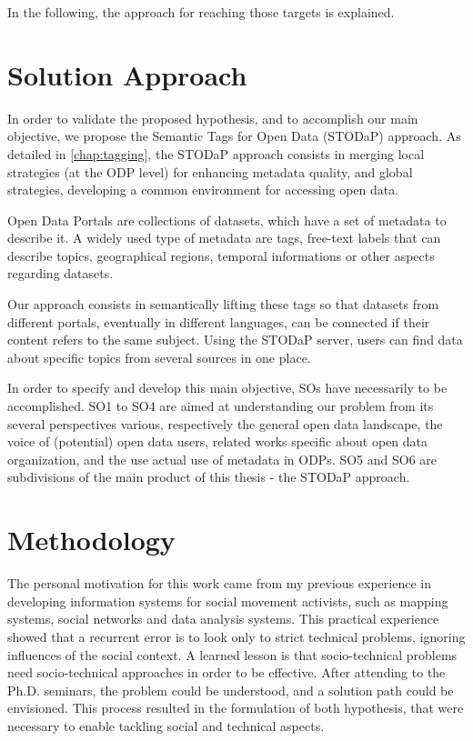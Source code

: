 {In the following, the approach for reaching those targets is explained.

\section{Solution Approach}

In order to validate the proposed hypothesis, and to accomplish our main objective, we propose the Semantic Tags for Open Data (STODaP) approach.
As detailed in \autoref{chap:tagging}, the STODaP approach consists in merging local strategies (at the ODP level) for enhancing metadata quality, and global strategies, developing a common environment for accessing open data.

Open Data Portals are collections of datasets, which have a set of metadata to describe it.
A widely used type of metadata are tags, free-text labels that can describe topics, geographical regions, temporal informations or other aspects regarding datasets.

Our approach consists in semantically lifting these tags so that datasets from different portals, eventually in different languages, can be connected if their content refers to the same subject. 
Using the STODaP server, users can find data about specific topics from several sources in one place.

In order to specify and develop this main objective, SOs have necessarily to be accomplished.
SO1 to SO4 are aimed at understanding our problem from its several perspectives various, respectively the general open data landscape, the voice of (potential) open data users, related works specific about open data organization, and the use actual use of metadata in ODPs.
SO5 and SO6 are subdivisions of the main product of this thesis - the STODaP approach.



\section{Methodology}

The personal motivation for this work came from my previous experience in developing information systems for social movement activists, such as mapping systems, social networks and data analysis systems.
This practical experience showed that a recurrent error is to look only to strict technical problems, ignoring influences of the social context.
A learned lesson is that socio-technical problems need socio-technical approaches in order to be effective.
After attending to the Ph.D. seminars, the problem could be understood, and a solution path could be envisioned.
This process resulted in the formulation of both hypothesis, that were necessary to enable tackling social and technical aspects.

}
